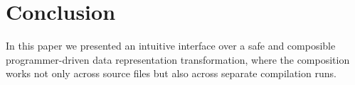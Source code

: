 \section{Conclusion}
\label{sec:concls}

In this paper we presented an intuitive interface over a safe and composible programmer-driven data representation transformation, where the composition works not only across source
files but also across separate compilation runs. %